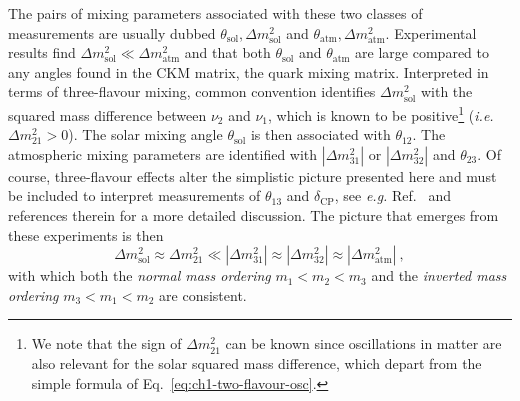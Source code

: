  The pairs of mixing parameters associated with these two classes of
  measurements are usually dubbed
  $\theta_{\text{sol}}, \Delta m^{2}_{\text{sol}}$ and
  $\theta_{\text{atm}}, \Delta m^{2}_{\text{atm}}$. Experimental results find
  $\Delta m^{2}_{\text{sol}} \ll \Delta m^{2}_{\text{atm}}$ and that both
  $\theta_{\text{sol}}$ and $\theta_{\text{atm}}$ are large compared to any
  angles found in the CKM matrix, the quark mixing matrix. Interpreted in terms
  of three-flavour mixing, common convention identifies
  $\Delta m_{\text{sol}}^{2}$ with the squared mass difference between $\nu_{2}$
  and $\nu_{1}$, which is known to be positive\footnote{We note that the sign of
    $\Delta m_{21}^{2}$ can be known since oscillations in matter are also
    relevant for the solar squared mass difference, which depart from the simple
    formula of Eq.~\eqref{eq:ch1-two-flavour-osc}.} (\textit{i.e.}
  $\Delta m^{2}_{21} > 0$). The solar mixing angle $\theta_{\text{sol}}$ is then
  associated with $\theta_{12}$. The atmospheric mixing parameters are
  identified with $|\Delta m_{31}^{2}|$ or $|\Delta m_{32}^{2}|$ and
  $\theta_{23}$. Of course, three-flavour effects alter the simplistic picture
  presented here and must be included to interpret measurements of $\theta_{13}$
  and $\delta_{\text{CP}}$, see \textit{e.g.} Ref.~\cite{Giganti:2017fhf} and
  references therein for a more detailed discussion. The picture that emerges
  from these experiments is then
  \begin{equation}
    \Delta m^{2}_{\text{sol}} \approx \Delta m^{2}_{21} \ll |\Delta m_{31}^{2}| \approx |\Delta m_{32}^{2}| \approx |\Delta m_{\text{atm}}^{2}| \ ,
  \end{equation}
  with which both the \textit{normal mass ordering} $m_{1} < m_{2} < m_{3}$ and
  the \textit{inverted mass ordering} $m_{3} < m_{1} < m_{2}$ are consistent.

